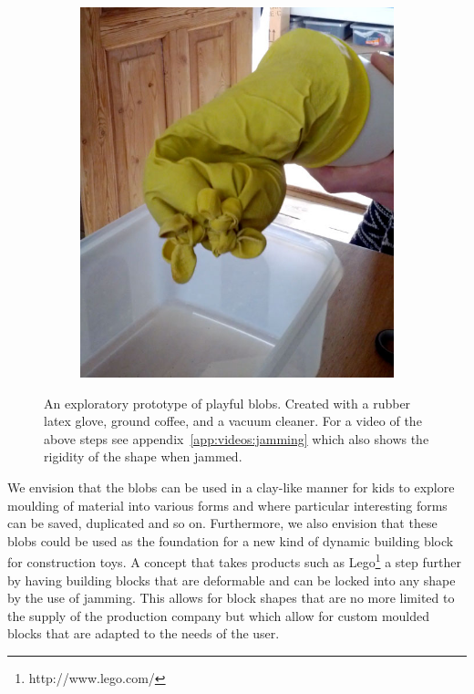 \begin{figure}[h]
\begin{subfigure}[t]{.28\textwidth}
    \includegraphics[width=\linewidth]{figures/jamming/concepts/blobs/glove-3}
    \label{fig:ch:jamming:concepts:blobs:g3}
  \end{subfigure}
  \caption{An exploratory prototype of playful blobs. Created with a rubber latex glove, ground coffee, and a vacuum cleaner. For a video of the above steps see appendix~\ref{app:videos:jamming} which also shows the rigidity of the shape when jammed.}
  \label{fig:ch:jamming:concepts:blobs:gloves}
\end{figure}

We envision that the blobs can be used in a clay-like manner for kids to explore moulding of material into various forms and where particular interesting forms can be saved, duplicated and so on.
Furthermore, we also envision that these blobs could be used as the foundation for a new kind of dynamic building block for construction toys.
A concept that takes products such as Lego\footnote{http://www.lego.com/} a step further by having building blocks that are deformable and can be locked into any shape by the use of jamming.
This allows for block shapes that are no more limited to the supply of the production company but which allow for custom moulded blocks that are adapted to the needs of the user.

